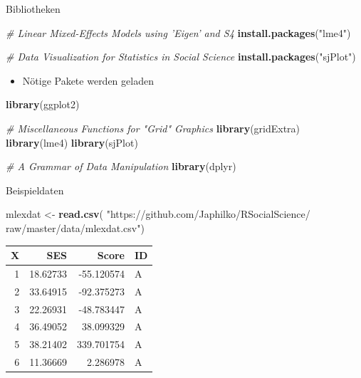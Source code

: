 \documentclass[ignorenonframetext,]{beamer}
\newenvironment{Shaded}{}{}
\newcommand{\KeywordTok}[1]{\textcolor[rgb]{0.00,0.44,0.13}{\textbf{{#1}}}}
\newcommand{\StringTok}[1]{\textcolor[rgb]{0.25,0.44,0.63}{{#1}}}
\newcommand{\CommentTok}[1]{\textcolor[rgb]{0.38,0.63,0.69}{\textit{{#1}}}}
\newcommand{\NormalTok}[1]{{#1}}
\providecommand{\tightlist}{%
\setlength{\itemsep}{0pt}\setlength{\parskip}{0pt}}
\begin{document}
\begin{frame}[fragile]{Bibliotheken}

\begin{Shaded}
\begin{Highlighting}[]
\CommentTok{# Linear Mixed-Effects Models using 'Eigen' and S4}
\KeywordTok{install.packages}\NormalTok{(}\StringTok{"lme4"}\NormalTok{)}

\CommentTok{# Data Visualization for Statistics in Social Science}
\KeywordTok{install.packages}\NormalTok{(}\StringTok{"sjPlot"}\NormalTok{)}
\end{Highlighting}
\end{Shaded}

\begin{itemize}
\tightlist
\item
  Nötige Pakete werden geladen
\end{itemize}

\begin{Shaded}
\begin{Highlighting}[]
\KeywordTok{library}\NormalTok{(ggplot2)}

\CommentTok{# Miscellaneous Functions for "Grid" Graphics}
\KeywordTok{library}\NormalTok{(gridExtra)}
\KeywordTok{library}\NormalTok{(lme4)}
\KeywordTok{library}\NormalTok{(sjPlot)}

\CommentTok{# A Grammar of Data Manipulation}
\KeywordTok{library}\NormalTok{(dplyr)}
\end{Highlighting}
\end{Shaded}

\end{frame}

\begin{frame}[fragile]{Beispieldaten}

\begin{Shaded}
\begin{Highlighting}[]
\NormalTok{mlexdat <-}\StringTok{ }\KeywordTok{read.csv}\NormalTok{(}
\StringTok{"https://github.com/Japhilko/RSocialScience/}
\StringTok{raw/master/data/mlexdat.csv"}\NormalTok{) }
\end{Highlighting}
\end{Shaded}

\begin{longtable}[]{@{}rrrl@{}}
\toprule
X & SES & Score & ID\tabularnewline
\midrule
\endhead
1 & 18.62733 & -55.120574 & A\tabularnewline
2 & 33.64915 & -92.375273 & A\tabularnewline
3 & 22.26931 & -48.783447 & A\tabularnewline
4 & 36.49052 & 38.099329 & A\tabularnewline
5 & 38.21402 & 339.701754 & A\tabularnewline
6 & 11.36669 & 2.286978 & A\tabularnewline
\bottomrule
\end{longtable}

\end{frame}
\end{document}
